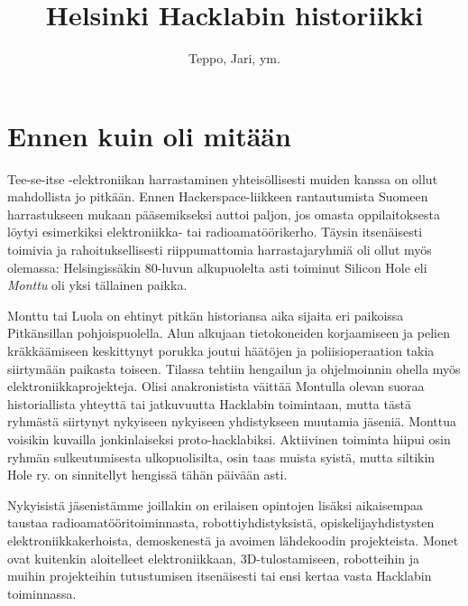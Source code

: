 \documentclass[a4paper]{memoir}
\title{Helsinki Hacklabin historiikki}
\author{Teppo, Jari, ym.}
\newlength{\distance}
\begin{document}


\setsansfont{Tahoma}
 






\section*{Ennen kuin oli mitään}

Tee-se-itse -elektroniikan harrastaminen yhteisöllisesti muiden kanssa on ollut mahdollista jo pitkään. Ennen Hackerspace-liikkeen rantautumista Suomeen harrastukseen mukaan pääsemikseksi auttoi paljon, jos omasta oppilaitoksesta löytyi esimerkiksi elektroniikka- tai radioamatöörikerho. Täysin itsenäisesti toimivia ja rahoituksellisesti riippumattomia harrastajaryhmiä oli ollut myös olemassa: Helsingissäkin 80-luvun alkupuolelta asti toiminut Silicon Hole eli \textit{Monttu} oli yksi tällainen paikka.

Monttu tai Luola on ehtinyt pitkän historiansa aika sijaita eri paikoissa Pitkänsillan pohjoispuolella. Alun alkujaan tietokoneiden korjaamiseen ja pelien kräkkäämiseen keskittynyt porukka joutui häätöjen ja poliisioperaation takia siirtymään paikasta toiseen. Tilassa tehtiin hengailun ja ohjelmoinnin ohella myös elektroniikkaprojekteja. Olisi anakronistista väittää Montulla olevan suoraa historiallista yhteyttä tai jatkuvuutta Hacklabin toimintaan, mutta tästä ryhmästä siirtynyt nykyiseen nykyiseen yhdistykseen muutamia jäseniä. Monttua voisikin kuvailla jonkinlaiseksi proto-hacklabiksi. Aktiivinen toiminta hiipui osin ryhmän sulkeutumisesta ulkopuolisilta, osin taas muista syistä, mutta siltikin Hole ry. on sinnitellyt hengissä tähän päivään asti.

Nykyisistä jäsenistämme joillakin on erilaisen opintojen lisäksi aikaisempaa taustaa radioamatööritoiminnasta, robottiyhdistyksistä, opiskelijayhdistysten elektroniikkakerhoista, demoskenestä ja avoimen lähdekoodin projekteista. Monet ovat kuitenkin aloitelleet elektroniikkaan, 3D-tulostamiseen, robotteihin ja muihin projekteihin tutustumisen itsenäisesti tai ensi kertaa vasta Hacklabin toiminnassa.
\end{document}
